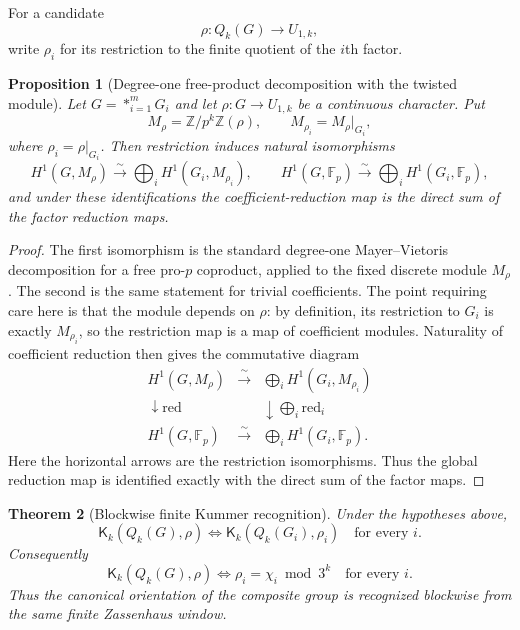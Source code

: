 \documentclass[11pt]{article}
\newtheorem{theorem}{Theorem}[section]
\newtheorem{proposition}[theorem]{Proposition}
\newcommand{\Fp}{\mathbb F_p}
\begin{document}
For a candidate
\[
\rho:Q_k(G)\to U_{1,k},
\]
write $\rho_i$ for its restriction to the finite quotient of the $i$th factor.

\begin{proposition}[Degree-one free-product decomposition with the twisted module]
Let $G=*_{i=1}^mG_i$ and let $\rho:G\to U_{1,k}$ be a continuous character. Put
\[
M_\rho=\mathbb Z/p^k\mathbb Z(\rho),\qquad
M_{\rho_i}=M_\rho|_{G_i},
\]
where $\rho_i=\rho|_{G_i}$. Then restriction induces natural isomorphisms
\[
H^1(G,M_\rho)\xrightarrow{\sim}\bigoplus_i H^1(G_i,M_{\rho_i}),
\qquad
H^1(G,\Fp)\xrightarrow{\sim}\bigoplus_i H^1(G_i,\Fp),
\]
and under these identifications the coefficient-reduction map is the direct sum of the factor reduction maps.
\end{proposition}

\begin{proof}
The first isomorphism is the standard degree-one Mayer--Vietoris decomposition for a free pro-$p$ coproduct, applied to the fixed discrete module $M_\rho$. The second is the same statement for trivial coefficients. The point requiring care here is that the module depends on $\rho$: by definition, its restriction to $G_i$ is exactly $M_{\rho_i}$, so the restriction map is a map of coefficient modules. Naturality of coefficient reduction then gives the commutative diagram
\[
\begin{array}{ccc}
H^1(G,M_\rho) & \xrightarrow{\ \sim\ } & \bigoplus_i H^1(G_i,M_{\rho_i})\\
\downarrow\!\mathrm{red} & & \downarrow\!\bigoplus_i\mathrm{red}_i\\
H^1(G,\Fp) & \xrightarrow{\ \sim\ } & \bigoplus_i H^1(G_i,\Fp).
\end{array}
\]
Here the horizontal arrows are the restriction isomorphisms. Thus the global reduction map is identified exactly with the direct sum of the factor maps.
\end{proof}

\begin{theorem}[Blockwise finite Kummer recognition]
Under the hypotheses above,
\[
\mathsf K_k(Q_k(G),\rho)
\Longleftrightarrow
\mathsf K_k(Q_k(G_i),\rho_i)\quad\text{for every }i.
\]
Consequently
\[
\mathsf K_k(Q_k(G),\rho)
\Longleftrightarrow
\rho_i=\chi_i\bmod 3^k\quad\text{for every }i.
\]
Thus the canonical orientation of the composite group is recognized blockwise from the same finite Zassenhaus window.
\end{theorem}
\end{document}
